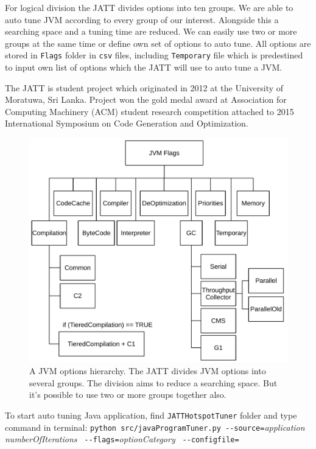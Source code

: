 \documentclass[
  digital, %
  oneside,
  notable, %
  nolof,     %
  nolot     %
]{fithesis3}
\begin{document}
For logical division the JATT divides options into ten groups. We are able to auto tune JVM according to every group of our interest. Alongside this a searching space and a tuning time are reduced. We can easily use two or more groups at the same time or define own set of options to auto tune. All options are stored in \texttt{Flags} folder in \texttt{csv} files, including \texttt{Temporary} file which is predestined to input own list of options which the JATT will use to auto tune a JVM.

The JATT is student project which originated in 2012 at the University of Moratuwa, Sri Lanka. Project won the gold medal award at Association for Computing Machinery (ACM) student research competition attached to 2015 International Symposium on Code Generation and Optimization. \cite{jatt-web}

\begin{figure}[h]
	\centering
	\includegraphics[width=13cm]{fig/flags.pdf}
	\caption{A JVM options hierarchy. The JATT divides JVM options into several groups. The division aims to reduce a searching space. But it's possible to use two or more groups together also. \cite{jatt-progress} \cite{jatt-web-medium}}
	\label{jatt-hierarchy}
\end{figure}

To start auto tuning Java application, find \texttt{JATTHotspotTuner} folder and type command in terminal: \newline \texttt{python src/javaProgramTuner.py -\--source=}\textit{application} \texttt{}\textit{numberOfIterations} \texttt{\ -\--flags=}\textit{optionCategory} \texttt{\ -\--configfile=}\textit{} \newline
\end{document}
